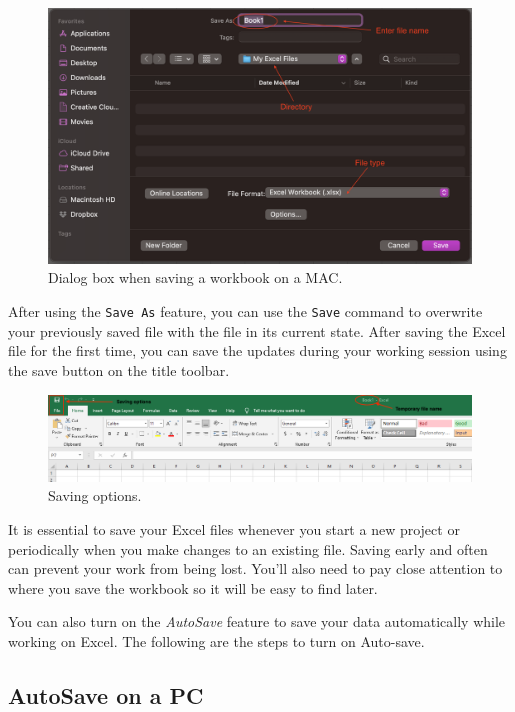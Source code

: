 \documentclass[
]{book}
\begin{document}
\begin{figure}

{\centering \includegraphics[width=0.6\linewidth]{saving-mac2} 

}

\caption{Dialog box when saving a workbook on a MAC.}\label{fig:saving-dialog-box-mac}
\end{figure}

After using the \texttt{Save\ As} feature, you can use the \texttt{Save} command to overwrite your previously saved file with the file in its current state. After saving the Excel file for the first time, you can save the updates during your working session using the save button on the title toolbar.

\begin{figure}

{\centering \includegraphics[width=0.85\linewidth]{saving-options} 

}

\caption{Saving options.}\label{fig:saving-options}
\end{figure}

It is essential to save your Excel files whenever you start a new project or periodically when you make changes to an existing file. Saving early and often can prevent your work from being lost. You'll also need to pay close attention to where you save the workbook so it will be easy to find later.

You can also turn on the \emph{AutoSave} feature to save your data automatically while working on Excel. The following are the steps to turn on Auto-save.

\hypertarget{autosave-on-a-pc}{%
\subsection{AutoSave on a PC}\label{autosave-on-a-pc}}
\end{document}
